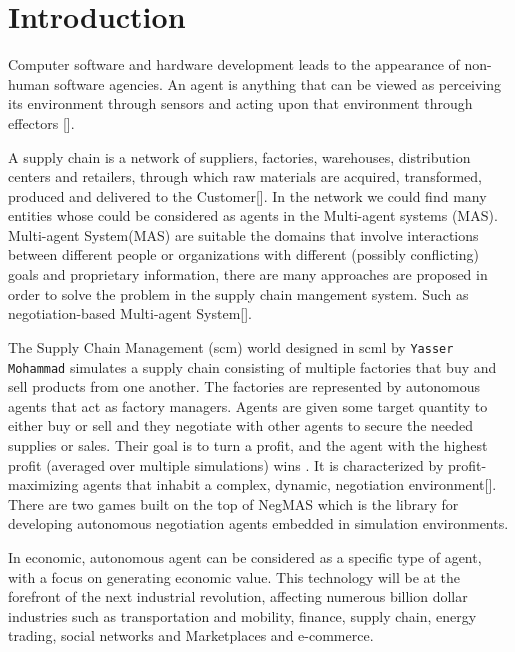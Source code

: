 \chapter{Introduction}
Computer software and hardware development leads to the appearance of non-human software agencies. An agent is anything that can be viewed as perceiving its environment through sensors and acting upon that environment through effectors [].

A supply chain is a network of suppliers, factories, warehouses, distribution centers and retailers, through which raw materials are acquired, transformed, produced and delivered to the Customer[]. In the network we could find many entities whose could be considered as agents in the Multi-agent systems (MAS). Multi-agent System(MAS) are suitable the domains that involve interactions between different people
or organizations with different (possibly conflicting) goals and
proprietary information, there are many approaches are proposed in order to solve the problem in the supply chain mangement system. Such as negotiation-based Multi-agent System[].

The Supply Chain Management (\gls{scm}) world designed in \gls{scml} by \texttt{Yasser Mohammad} simulates a supply chain consisting of multiple factories that buy and sell products from one another. The factories are represented by autonomous agents that act as factory managers. Agents are given some target quantity to either buy or sell and they negotiate with other agents to secure the needed supplies or sales. Their goal is to turn a profit, and the agent with the highest profit (averaged over multiple simulations) wins \parencite{Mohammad2019}. It is characterized by profit-maximizing agents that inhabit a complex, dynamic, negotiation environment[]. There are two games built on the top of NegMAS which is the library for developing autonomous negotiation agents embedded in simulation environments.

In economic, autonomous agent can be considered as a specific type of agent, with a focus on generating economic value. This technology will be at the forefront of the next industrial revolution, affecting numerous billion dollar industries such as transportation and mobility, finance, supply chain, energy trading, social networks and Marketplaces and e-commerce.

